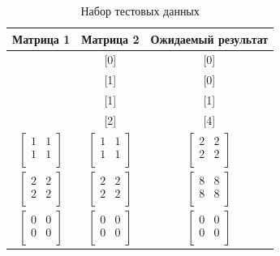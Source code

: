 \documentclass[a4paper,14pt]{report}
\begin{document}
\begin{table}[h!]
	\caption{Набор тестовых данных}
		\begin{tabular}{|c | c | c |}
	 	\hline
		Матрица 1 & Матрица 2 & Ожидаемый результат \\ [0.5ex]
	 	\hline\hline
		[0] & [0] & [0] \\
		\hline
		[0] & [1] & [0] \\
		\hline
		[1] & [1] & [1] \\
		\hline
		[2] & [2] & [4] \\
		\hline
		$\begin{bmatrix}
		1 & 1 \\
		1 & 1 \\
		\end{bmatrix}$ &
		$\begin{bmatrix}
		1 & 1 \\
		1 & 1 \\
		\end{bmatrix}$ &
		$\begin{bmatrix}
		2 & 2 \\
		2 & 2 \\
		\end{bmatrix}$ \\
		\hline
		$\begin{bmatrix}
		2 & 2 \\
		2 & 2 \\
		\end{bmatrix}$ &
		$\begin{bmatrix}
		2 & 2 \\
		2 & 2 \\
		\end{bmatrix}$ &
		$\begin{bmatrix}
		8 & 8 \\
		8 & 8 \\
		\end{bmatrix}$ \\
		\hline

		$\begin{bmatrix}
		0 & 0 \\
		0 & 0 \\
		\end{bmatrix}$ &
		$\begin{bmatrix}
		0 & 0 \\
		0 & 0 \\
		\end{bmatrix}$ &
		$\begin{bmatrix}
		0 & 0 \\
		0 & 0 \\
		\end{bmatrix}$ \\
		\hline


\end{tabular}
\end{table}
\end{document}
